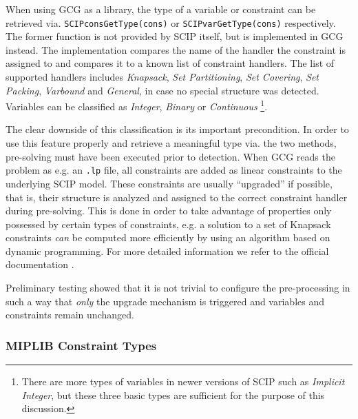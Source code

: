 				When using \ac{GCG} as a library, the type of a variable or constraint can be retrieved via. \lstinline|SCIPconsGetType(cons)| or \lstinline|SCIPvarGetType(cons)| respectively.
				The former function is not provided by \ac{SCIP} itself, but is implemented in \ac{GCG} instead.
				The implementation compares the name of the handler the constraint is assigned to and compares it to a known list of constraint handlers. 
				The list of supported handlers includes \emph{Knapsack}, \emph{Set Partitioning}, \emph{Set Covering}, \emph{Set Packing}, \emph{Varbound} and \emph{General}, in case no special structure was detected. 
				Variables can be classified as \emph{Integer}, \emph{Binary} or \emph{Continuous}
				\footnote{There are more types of variables in newer versions of \ac{SCIP} such as \emph{Implicit Integer}, but these three basic types are sufficient for the purpose of this discussion.}.
				
				The clear downside of this classification is its important precondition.
				In order to use this feature properly and retrieve a meaningful type via. the two methods, pre-solving must have been executed prior to detection.
				When \ac{GCG} reads the problem as e.g. an \lstinline|.lp| file, all constraints are added as linear constraints to the underlying \ac{SCIP} model.
				These constraints are usually \enquote{upgraded} if possible, that is, their structure is analyzed and assigned to the correct constraint handler during pre-solving.
				This is done in order to take advantage of properties only possessed by certain types of constraints, e.g. a solution to a set of Knapsack constraints \textit{can} be computed more efficiently by using an algorithm based on dynamic programming.
				For more detailed information we refer to the official documentation \cite{SCIPDoxygenDocumentation}.
				
				Preliminary testing showed that it is not trivial to configure the pre-processing in such a way that \textit{only} the upgrade mechanism is triggered and variables and constraints remain unchanged. 
		
			\subsubsection{MIPLIB Constraint Types}
			
